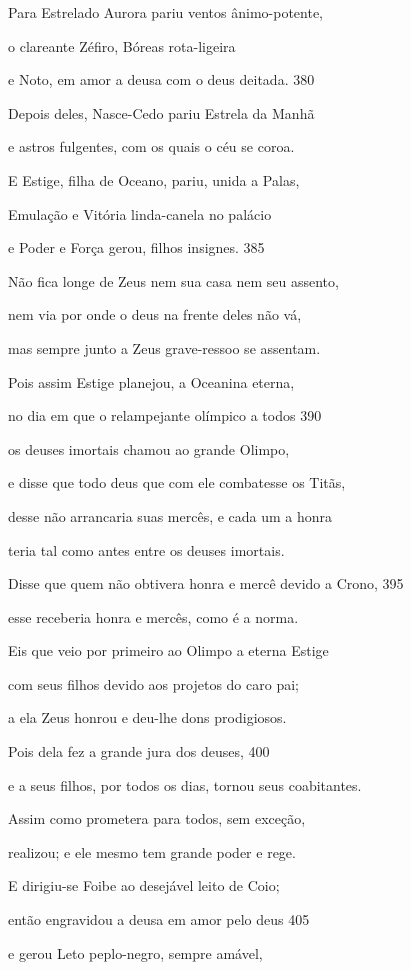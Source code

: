 Para Estrelado Aurora pariu ventos ânimo-potente,

o clareante Zéfiro, Bóreas rota-ligeira

e Noto, em amor a deusa com o deus deitada. \num{380}

Depois deles, Nasce-Cedo pariu Estrela da Manhã

e astros fulgentes, com os quais o céu se coroa.

\quad{}E Estige, filha de Oceano, pariu, unida a Palas,

Emulação e Vitória linda-canela no palácio

e Poder e Força gerou, filhos insignes. \num{385}

Não fica longe de Zeus nem sua casa nem seu assento,

nem via por onde o deus na frente deles não vá,

mas sempre junto a Zeus grave-ressoo se assentam.

Pois assim Estige planejou, a Oceanina eterna,

no dia em que o relampejante olímpico a todos \num{390}

os deuses imortais chamou ao grande Olimpo,

e disse que todo deus que com ele combatesse os Titãs,

desse não arrancaria suas mercês, e cada um a honra

teria tal como antes entre os deuses imortais.

Disse que quem não obtivera honra e mercê devido a Crono, \num{395}

esse receberia honra e mercês, como é a norma.

Eis que veio por primeiro ao Olimpo a eterna Estige

com seus filhos devido aos projetos do caro pai;

a ela Zeus honrou e deu-lhe dons prodigiosos.

Pois dela fez a grande jura dos deuses, \num{400}

e a seus filhos, por todos os dias, tornou seus coabitantes.

Assim como prometera para todos, sem exceção,

realizou; e ele mesmo tem grande poder e rege.

\quad{}E dirigiu-se Foibe ao desejável leito de Coio;

então engravidou a deusa em amor pelo deus \num{405}

e gerou Leto peplo-negro, sempre amável,


